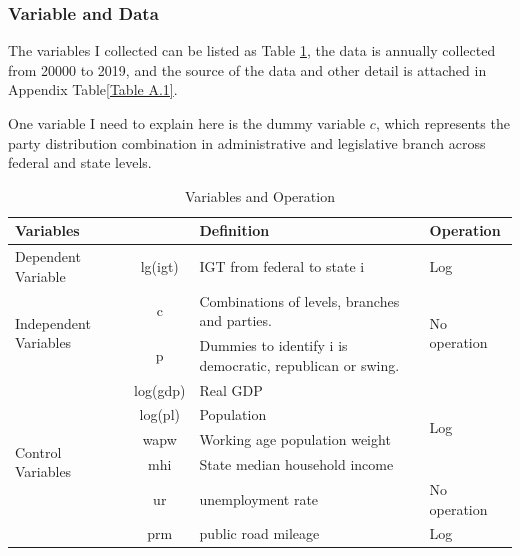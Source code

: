 \subsubsection{Variable and Data}
The variables I collected can be listed as Table \ref*{Table 2.5}, the data is annually collected from 20000 to 2019, and the source of the data and other detail is attached in Appendix Table\ref*{Table A.1}.

One variable I need to explain here is the dummy variable $c$, which represents the party distribution combination in administrative and legislative branch across federal and state levels.


\begin{table}[htbp]
    \centering
    \caption{Variables and Operation}
    \begin{tabular}{lcp{12.715em}p{6.145em}}
        \toprule
        \multicolumn{2}{p{9.93em}}{Variables }                        & Definition & Operation                                                                                    \\
        \midrule
        \multicolumn{1}{p{4.715em}}{Dependent Variable}               & lg(igt)    & IGT from federal to state i                               & Log                              \\
        \midrule
        \multicolumn{1}{l}{\multirow{2}[4]{*}{Independent Variables}} & c          & Combinations of levels, branches and parties.             & \multirow{2}[4]{*}{No operation} \\
        \cmidrule{2-3}                                                & p          & Dummies to identify i is democratic, republican or swing. & \multicolumn{1}{c}{}             \\
        \midrule
        \multicolumn{1}{l}{\multirow{6}[12]{*}{Control Variables}}    & log(gdp)   & \multicolumn{1}{l}{Real GDP}                              & \multirow{4}[8]{*}{Log }         \\
        \cmidrule{2-3}                                                & log(pl)    & \multicolumn{1}{l}{Population }                           & \multicolumn{1}{c}{}             \\
        \cmidrule{2-3}                                                & wapw       & Working age population weight                             & \multicolumn{1}{c}{}             \\
        \cmidrule{2-3}                                                & mhi        & State median household income                             & \multicolumn{1}{c}{}             \\
        \cmidrule{2-4}                                                & ur         & unemployment rate                                         & No operation                     \\
        \cmidrule{2-4}                                                & prm        & public road mileage                                       & Log                              \\
        \bottomrule
    \end{tabular}%
    \label{Table 2.5}%
\end{table}%

